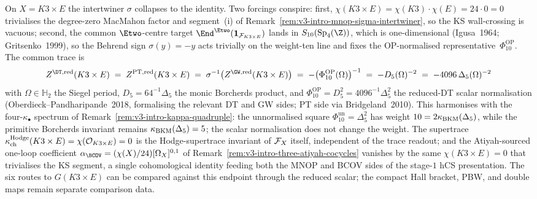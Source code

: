 \begin{remark}[Corollary at \texorpdfstring{$K3 \times E$}{K3 x E}: \texorpdfstring{$Z^{\DT, \mathrm{red}} = -(\Phi_{10}^{\mathrm{OP}})^{-1}$}{Z-DT, red = -Phi-10-OP-inverse}]
\label{rem:v3-intro-mnop-k3e-phi10}
On $X = K3 \times E$ the intertwiner $\sigma$ collapses to the identity. Two forcings conspire: first, $\chi(K3 \times E) = \chi(K3) \cdot \chi(E) = 24 \cdot 0 = 0$ trivialises the degree-zero MacMahon factor and segment~(i) of Remark~\ref{rem:v3-intro-mnop-sigma-intertwiner}, so the KS wall-crossing is vacuous; second, the common $\Etwo$-centre target $\End^{\Etwo}(\mathbf{1}_{\cF_{K3 \times E}})$ lands in $S_{10}(\mathrm{Sp}_4(\Z))$, which is one-dimensional (Igusa~1964; Gritsenko~1999), so the Behrend sign $\sigma(y) = -y$ acts trivially on the weight-ten line and fixes the OP-normalised representative~$\Phi_{10}^{\mathrm{OP}}$. The common trace is
\[
 Z^{\DT, \mathrm{red}}(K3 \times E) \;=\; Z^{\mathrm{PT}, \mathrm{red}}(K3 \times E)
 \;=\; \sigma^{-1}\bigl(Z^{\GW, \mathrm{red}}(K3 \times E)\bigr)
 \;=\; -\bigl(\Phi_{10}^{\mathrm{OP}}(\Omega)\bigr)^{-1}
 \;=\; -D_5(\Omega)^{-2}
 \;=\; -4096\,\Delta_5(\Omega)^{-2}
\]
with $\Omega \in \mathbb{H}_2$ the Siegel period, $D_5=64^{-1}\Delta_5$ the monic Borcherds product, and $\Phi_{10}^{\mathrm{OP}}=D_5^2=4096^{-1}\Delta_5^2$ the reduced-DT scalar normalisation (Oberdieck--Pandharipande~2018, formalising the relevant DT and GW sides; PT side via Bridgeland~2010). This harmonises with the four-$\kappa_\bullet$ spectrum of Remark~\ref{rem:v3-intro-kappa-quadruple}: the unnormalised square $\Phi_{10}^{\mathrm{un}} = \Delta_5^2$ has weight $10 = 2 \kappa_{\mathrm{BKM}}(\Delta_5)$, while the primitive Borcherds invariant remains $\kappa_{\mathrm{BKM}}(\Delta_5)=5$; the scalar normalisation does not change the weight. The supertrace $\kappa_{\mathrm{ch}}^{\mathrm{Hodge}}(K3 \times E) = \chi(\mathcal{O}_{K3 \times E}) = 0$ is the Hodge-supertrace invariant of $\mathcal{F}_X$ itself, independent of the trace readout; and the Atiyah-sourced one-loop coefficient $\alpha_\BCOV = (\chi(X)/24)[\Omega_X]^{0,1}$ of Remark~\ref{rem:v3-intro-three-atiyah-cocycles} vanishes by the same $\chi(K3 \times E) = 0$ that trivialises the KS segment, a single cohomological identity feeding both the MNOP and BCOV sides of the stage-$1$ hCS presentation. The six routes to \(G(K3 \times E)\) can be compared against this endpoint through the reduced scalar; the compact Hall bracket, PBW, and double maps remain separate comparison data.
\end{remark}

